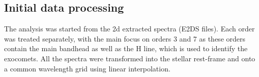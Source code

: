 \documentclass{aa}
\begin{document}




%
%
%
%
%
%


\subsection{Initial data processing}
The analysis was started from the 2d extracted spectra (E2DS files). %
%
Each order was treated separately, with the main focus on orders 3 and 7 %
as these orders contain the main  bandhead as well as the  H line, which is used to identify the exocomets.
%
All the spectra were transformed into the stellar rest-frame and onto a common wavelength grid using linear interpolation. %
\end{document}

